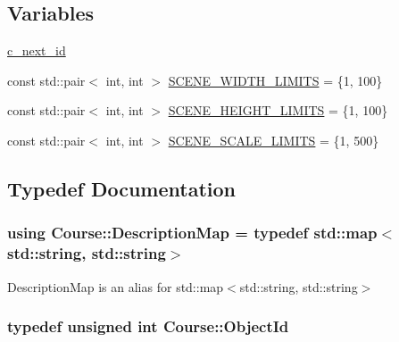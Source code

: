 \subsection*{Variables}
\begin{DoxyCompactItemize}
\item 
\hyperlink{namespaceCourse_ac8daa99f674ebf07facd81c13a1b84b6}{c\-\_\-next\-\_\-id}
\item 
const std\-::pair$<$ int, int $>$ \hyperlink{namespaceCourse_adcb4270c5ceb9815961b6dc143fa55e0}{S\-C\-E\-N\-E\-\_\-\-W\-I\-D\-T\-H\-\_\-\-L\-I\-M\-I\-T\-S} = \{1, 100\}
\item 
const std\-::pair$<$ int, int $>$ \hyperlink{namespaceCourse_af3db542553add269c70449ef3db28ea3}{S\-C\-E\-N\-E\-\_\-\-H\-E\-I\-G\-H\-T\-\_\-\-L\-I\-M\-I\-T\-S} = \{1, 100\}
\item 
const std\-::pair$<$ int, int $>$ \hyperlink{namespaceCourse_a5f86688257b627d010ece8d242b9ff9c}{S\-C\-E\-N\-E\-\_\-\-S\-C\-A\-L\-E\-\_\-\-L\-I\-M\-I\-T\-S} = \{1, 500\}
\end{DoxyCompactItemize}


\subsection{Typedef Documentation}
\hypertarget{namespaceCourse_aed04c39dde5a591d4b353686d3d0e306}{
\subsubsection[{Description\-Map}]{\setlength{\rightskip}{0pt plus 5cm}using {\bf Course\-::\-Description\-Map} = typedef std\-::map$<$std\-::string, std\-::string$>$}}\label{namespaceCourse_aed04c39dde5a591d4b353686d3d0e306}


Description\-Map is an alias for std\-::map$<$std\-::string, std\-::string$>$ 

\hypertarget{namespaceCourse_a9a16e743c9813da00109e4991afd2f3e}{
\subsubsection[{Object\-Id}]{\setlength{\rightskip}{0pt plus 5cm}typedef unsigned int {\bf Course\-::\-Object\-Id}}}\label{namespaceCourse_a9a16e743c9813da00109e4991afd2f3e}


